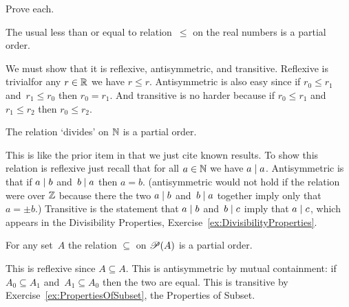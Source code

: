 \documentclass{ibl}  %
\begin{document}
\begin{problem} Prove each.
\begin{exes}
\begin{exercise}[\midlength]
  The usual less than or equal to relation~$\leq$ on 
  the real numbers is a partial order.
\end{exercise}
\begin{answer}
  We must show that it is reflexive, antisymmetric, and transitive.
  Reflexive is trivial\Dash for any $r\in\mathbb{R}$ we have $r\leq r$.
  Antisymmetric is also easy since if $r_0\leq r_1$ and~$r_1\leq r_0$
  then $r_0=r_1$.
  And transitive is no harder because if $r_0\leq r_1$ and~$r_1\leq r_2$
  then $r_0\leq r_2$.  
\end{answer}
\begin{exercise} 
  The relation `divides' on $\mathbb{N}$ is a partial order.
\end{exercise}
\begin{answer}
  This is like the prior item in that we just cite known results.
  To show this relation is reflexive just recall that for all $a\in\mathbb{N}$ we have
  $a\mid a$.
  Antisymmetric is that if $a\mid b$ and~$b\mid a$ then
  $a=b$.
  (\remark antisymmetric would not hold if the relation were over
  $\mathbb{Z}$ because there the two $a\mid b$ and~$b\mid a$ together imply
  only that $a=\pm b$.)
  Transitive is the statement that $a\mid b$ and~$b\mid c$ imply
  that $a\mid c$, which appears
  in the Divisibility Properties, Exercise~\ref{ex:DivisibilityProperties}.  
\end{answer}
\begin{exercise} 
  For any set~$A$ the relation $\subseteq$ on $\mathscr{P}(A)$ is
  a partial order.
\end{exercise}
\begin{answer}
  This is reflexive since $A\subseteq A$.
  This is antisymmetric by mutual containment: 
  if $A_0\subseteq A_1$ and~$A_1\subseteq A_0$ then the two are equal.
  This is transitive by Exercise~\ref{ex:PropertiesOfSubset}, 
  the Properties of Subset.  
\end{answer}
\end{exes}

\end{problem}
\end{document}
